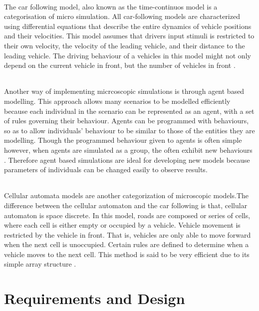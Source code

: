 \documentclass[a4paper,11pt,titlepage]{article}
\begin{document}
\paragraph{}
The car following model, also known as the time-continuos model is a categorisation of micro simulation. All car-following models are characterized using differential equations that  describe the entire dynamics of vehicle positions and their velocities. This model assumes that drivers input stimuli is restricted to their own velocity, the velocity of the leading vehicle, and their distance to the leading vehicle. The driving behaviour of a vehicles in this model might not only depend on the current vehicle in front, but the number of vehicles in front \cite{macrosim}.
\paragraph{}
Another way of implementing micrcoscopic simulations is through agent based modelling. This approach allows many scenarios to be modelled efficiently because each individual in the scenario can be represented as an agent, with a set of rules governing their behaviour. Agents can be programmed with behaviours, so as to allow individuals' behaviour to be similar to those of the entities they are modelling. Though the programmed behaviour given to agents is often simple however, when agents are simulated as a group, the often exhibit new behaviours \cite{2}.
Therefore agent based simulations are ideal for developing new models  because parameters of individuals can be changed easily to observe results.
\paragraph{}
Cellular automata models are another categorization of microscopic models.The difference between the cellular automaton and the car following is that, cellular automaton is space discrete. In this model, roads are composed or series of cells, where each cell is either empty or occupied by a vehicle. Vehicle movement is restricted by the vehicle in front. That is, vehicles are only able to move forward when the next cell is unoccupied. Certain rules are defined  to determine when a vehicle moves to the next cell. This method is said to be very efficient due to its simple array structure \cite{Ali}.

\part{Requirements and Design}
\end{document}
